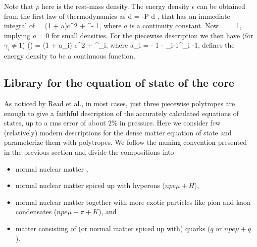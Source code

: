 Note that $\rho$ here is the rest-mass density.
The energy density $\epsilon$ can be obtained from the first law of thermodynamics as
\be
d  = -P d ,
\ee
that has an immediate integral of 
\be
\frac{\epsilon}{\rho} = (1 + a)c^2 +  \rho^{\gamma - 1},
\ee
where $a$ is a continuity constant. 
Now
\be
\lim_{\rho {}}  = 1,
\ee
implying $a=0$ for small densities.
For the piecewise description we then have (for $\gamma_i \ne 1$)
\be
\epsilon(\rho) = (1 + a_i) \rho c^2 +  \rho^{\gamma_i},
\ee
where
\be
a_i =  - 1 -   \rho_{i-1}^{\gamma_i -1},
\ee
defines the energy density to be a continuous function.

\subsection{Library for the equation of state of the core}

As noticed by Read et al.\cite{Read09}, in most cases, just three piecewise polytropes are enough to give a faithful description of the accurately calculated equations of states, up to a rms error of about $2\%$ in pressure.
Here we consider few (relatively) modern descriptions for the dense matter equation of state and parameterize them with polytropes.
We follow the naming convention presented in the previous section and divide the compositions into
\begin{itemize}
    \item normal nuclear matter \npem,
    \item normal nuclear matter spiced up with hyperons ($npe\mu + H$),
    \item normal nuclear matter together with more exotic particles like pion and kaon condensates ($npe\mu + \pi + K$), and
    \item matter consisting of (or normal matter spiced up with) quarks ($q$ or $npe\mu + q$).
\end{itemize}

